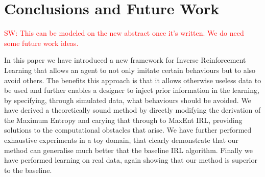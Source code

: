 \documentclass[letterpaper]{article}
\newcommand{\sw}[1]{\textcolor{red}{SW: #1}}
\begin{document}
\section{Conclusions and Future Work}

\sw{This can be modeled on the new abstract once it's written.  We do need some future work ideas.}

In this paper we have introduced a new framework for Inverse Reinforcement Learning that allows an agent to not only imitate certain behaviours but to also avoid others. The benefits this approach is that it allows otherwise useless data to be used and further enables a designer to inject prior information in the learning, by specifying, through simulated data, what behaviours should be avoided. We have derived a theoretically sound method by directly modifying the derivation of the Maximum Entropy and carying that through to MaxEnt IRL, providing solutions to the computational obstacles that arise. We have further performed exhaustive experiments in a toy domain, that clearly demonstrate that our method can generalise much better that the baseline IRL algorithm. Finally we have performed learning on real data, again showing that our method is superior to the baseline.  







	
\end{document}

